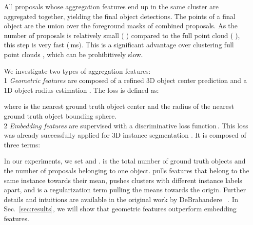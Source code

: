 \documentclass[10pt,twocolumn,letterpaper]{article}
\newcommand{\refsec}[1]{Sec.~\ref{sec:#1}}
\newcommand{\circlenum}[1]{{\textcircled{\footnotesize{#1}}}}
\begin{document}
All proposals whose aggregation features end up in the same cluster are aggregated together, yielding the final object detections. 
The points of a final object are the union over the foreground masks of combined proposals.
As the number of proposals is relatively small (\,\,) compared to the full point cloud (\,\,), this step is very fast (\,ms).
This is a significant advantage over clustering full point clouds \cite{ElichGCPR19, Lahoud19ICCV}, which can be prohibitively slow.

We investigate two types of aggregation features:\\
\circlenum{1} \textit{Geometric features}  are composed of a refined 3D object center prediction  and a 1D object radius estimation .
The loss is defined as: 
\vspace{-3px}

where  is the nearest ground truth object center and  the radius of the nearest ground truth object bounding sphere.\\
\circlenum{2} \textit{Embedding features}  are supervised with a discriminative loss function\,\cite{Brabandere17CVPRW}.
This loss was already successfully applied for 3D instance segmentation \cite{ElichGCPR19,Lahoud19ICCV}.
It is composed of three terms:




In our experiments, we set  and .
 is the total number of ground truth objects and  the number of proposals belonging to one object.
 pulls features that belong to the same instance towards their mean,
 pushes clusters with different instance labels apart,
 and  is a regularization term pulling the means towards the origin.
 Further details and intuitions are available in the original work by DeBrabandere \etal~\cite{Brabandere17CVPRW}.
In \refsec{results}, we will show that geometric features outperform embedding features.
\end{document}
